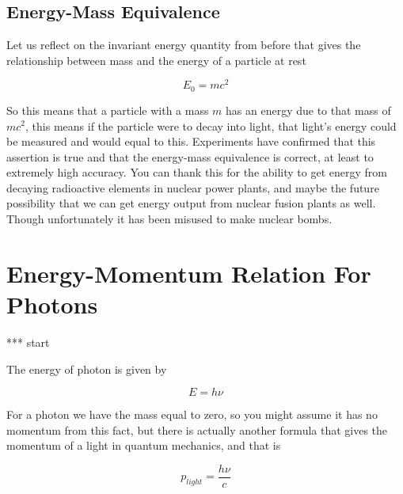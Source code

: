 
\subsection{Energy-Mass Equivalence} \label{subsect: Energy-Mass Equivalence}

Let us reflect on the invariant energy quantity from before that gives the relationship between mass and the energy of a particle at rest

\begin{equation}
	E_0 = mc^2
\end{equation}

So this means that a particle with a mass $m$ has an energy due to that mass of $mc^2$, this means if the particle were to decay into light, that light's energy could be measured and would equal to this.
Experiments have confirmed that this assertion is true and that the energy-mass equivalence is correct, at least to extremely high accuracy.
You can thank this for the ability to get energy from decaying radioactive elements in nuclear power plants, and maybe the future possibility that we can get energy output from nuclear fusion plants as well.
Though unfortunately it has been misused to make nuclear bombs.

\section{Energy-Momentum Relation For Photons} \label{sect: Energy-Momentum Relation For Photons}

*** start

The energy of photon is given by

\begin{equation}
	E = h \nu
\end{equation}

For a photon we have the mass equal to zero, so you might assume it has no momentum from this fact, but there is actually another formula that gives the momentum of a light in quantum mechanics, and that is

\begin{equation}
	p_{light} = \frac{h\nu}{c}
\end{equation}


